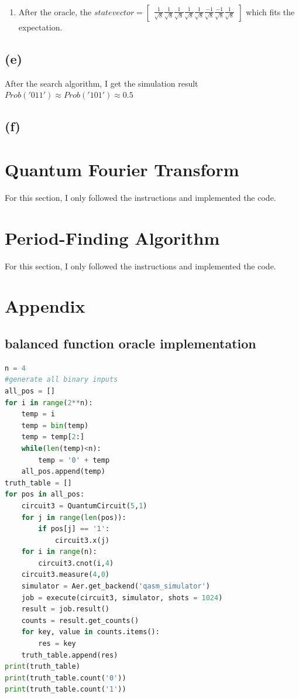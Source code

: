 \documentclass{article}
\begin{document}
\begin{CJK*}{UTF8}{bsmi}
\begin{enumerate}
    \item After the oracle, the  $statevector = \begin{bmatrix}
    \frac{1}{\sqrt{8}} \frac{1}{\sqrt{8}} \frac{1}{\sqrt{8}} \frac{1}{\sqrt{8}} \frac{1}{\sqrt{8}} \frac{-1}{\sqrt{8}} \frac{-1}{\sqrt{8}} \frac{1}{\sqrt{8}}
    \end{bmatrix}$
    which fits the expectation.
\end{enumerate}

\subsection{(e)}
After the search algorithm, I get the simulation result $Prob('011') \approx Prob('101') \approx 0.5$

\subsection{(f)}

\section{Quantum Fourier Transform}
For this section, I only followed the instructions and implemented the code.
\section{Period-Finding Algorithm}
For this section, I only followed the instructions and implemented the code.
\section{Appendix}
\subsection{balanced function oracle implementation}
\begin{lstlisting}[language=Python]
n = 4
#generate all binary inputs
all_pos = []
for i in range(2**n):
    temp = i
    temp = bin(temp)
    temp = temp[2:]
    while(len(temp)<n):
        temp = '0' + temp
    all_pos.append(temp)
truth_table = []
for pos in all_pos:
    circuit3 = QuantumCircuit(5,1)
    for j in range(len(pos)):
        if pos[j] == '1':
            circuit3.x(j)
    for i in range(n):
        circuit3.cnot(i,4)
    circuit3.measure(4,0)
    simulator = Aer.get_backend('qasm_simulator')
    job = execute(circuit3, simulator, shots = 1024)
    result = job.result()
    counts = result.get_counts()
    for key, value in counts.items():
        res = key
    truth_table.append(res)
print(truth_table)
print(truth_table.count('0'))
print(truth_table.count('1'))
\end{lstlisting}



\end{CJK*}
\end{document}
